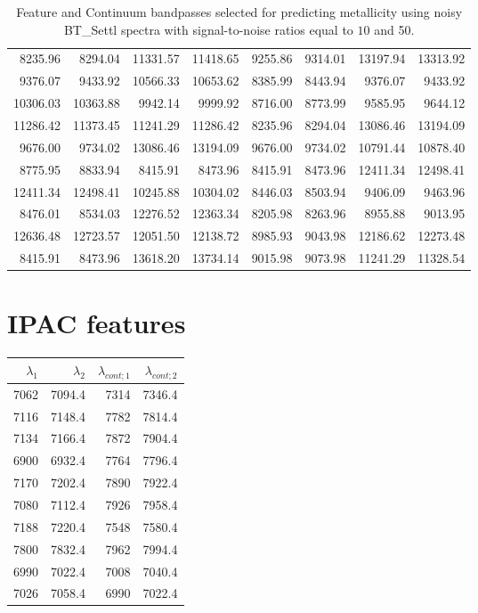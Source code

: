 \begin{appendix}
\begin{table*}
\begin{center}
\begin{tabular}{rrrr | rrrr}
8235.96  & 8294.04  &	11331.57 & 11418.65 & 9255.86 & 9314.01   &     13197.94 & 13313.92  \\
9376.07  & 9433.92  &	10566.33 & 10653.62 & 8385.99 & 8443.94   &     9376.07  & 9433.92    \\
10306.03 & 10363.88 &	 9942.14 & 9999.92  & 8716.00 & 8773.99   &     9585.95  & 9644.12    \\
11286.42 & 11373.45 &	11241.29 & 11286.42 & 8235.96 & 8294.04   &     13086.46 & 13194.09  \\
9676.00  & 9734.02  &	13086.46 & 13194.09 & 9676.00 & 9734.02   &     10791.44 & 10878.40  \\
8775.95  & 8833.94  &	8415.91  & 8473.96  & 8415.91 & 8473.96   &     12411.34 & 12498.41  \\
12411.34 & 12498.41 &	10245.88 & 10304.02 & 8446.03 & 8503.94   &     9406.09  & 9463.96    \\
8476.01  & 8534.03  &	12276.52 & 12363.34 & 8205.98 & 8263.96   &     8955.88  & 9013.95    \\
12636.48 & 12723.57 &	12051.50 & 12138.72 & 8985.93 & 9043.98   &     12186.62 & 12273.48  \\
8415.91  & 8473.96  &	13618.20 & 13734.14 & 9015.98 & 9073.98   &     11241.29 & 11328.54  \\

\hline
\end{tabular}
\caption {Feature and Continuum bandpasses selected for predicting metallicity 
      using noisy BT\_Settl spectra with signal-to-noise ratios
      equal to $10$ and 50.} \label{tab:irtf-met-noisy}
\end{center}
\end{table*}

\section{IPAC features}
\label{app:features:ipac}




\begin{table}
\begin{center}
\begin{tabular}{rrrr}
  \hline
  $\lambda_1$ & $\lambda_2$ & $\lambda_{cont;1}$ & $\lambda_{cont;2} $ \\ 
  \hline 
  
7062 & 7094.4 &	7314 & 7346.4 \\
7116 & 7148.4 &	7782 & 7814.4 \\
7134 & 7166.4 &	7872 & 7904.4 \\
6900 & 6932.4 &	7764 & 7796.4 \\
7170 & 7202.4 &	7890 & 7922.4 \\
7080 & 7112.4 &	7926 & 7958.4 \\
7188 & 7220.4 &	7548 & 7580.4 \\
7800 & 7832.4 &	7962 & 7994.4 \\
6990 & 7022.4 &	7008 & 7040.4 \\
7026 & 7058.4 &	6990 & 7022.4 \\


\end{tabular}
\end{center}
\end{table}
\end{appendix}
